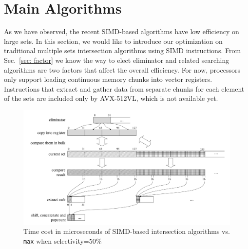 \documentclass[runningheads,a4paper]{llncs}
\begin{document}
\section{Main Algorithms}
As we have observed, the recent SIMD-based algorithms have low efficiency on large sets.
In this section, we would like to introduce our optimization on traditional multiple sets intersection algorithms using SIMD instructions.
From Sec.~\ref{sec: factor} we know the way to elect eliminator and related searching algorithms are two factors that affect the overall efficiency.
For now, processors only support loading continuous memory chunks into vector registers.
Instructions that extract and gather data from separate chunks for each element of the sets are included only by AVX-512VL, which is not available yet.
\begin{figure}
	\centering
	\includegraphics[width=1.0\linewidth]{simd_me}
	\caption{Time cost in microseconds of SIMD-based intersection algorithms vs. \texttt{max} when selectivity=50\%}
	\label{fig: simd_me}
\end{figure}
\end{document}
